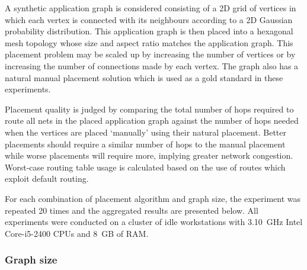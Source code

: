 			A synthetic application graph is considered consisting of a 2D grid of
			vertices in which each vertex is connected with its neighbours according
			to a 2D Gaussian probability distribution. This application graph is then
			placed into a hexagonal mesh topology whose size and aspect ratio matches
			the application graph. This placement problem may be scaled up by
			increasing the number of vertices or by increasing the number of
			connections made by each vertex. The graph also has a natural manual
			placement solution which is used as a gold standard in these experiments.
			
			Placement quality is judged by comparing the total number of hops
			required to route all nets in the placed application graph against the
			number of hops needed when the vertices are placed `manually' using their
			natural placement. Better placements should require a similar number of
			hops to the manual placement while worse placements will require more,
			implying greater network congestion. Worst-case routing table usage is
			calculated based on the use of routes which exploit default routing.
			
			For each combination of placement algorithm and graph size, the
			experiment was repeated 20 times and the aggregated results are presented
			below. All experiments were conducted on a cluster of idle workstations
			with 3.10~GHz Intel Core-i5-2400 CPUs and 8~GB of RAM.
			
			\subsubsection{Graph size}
				
